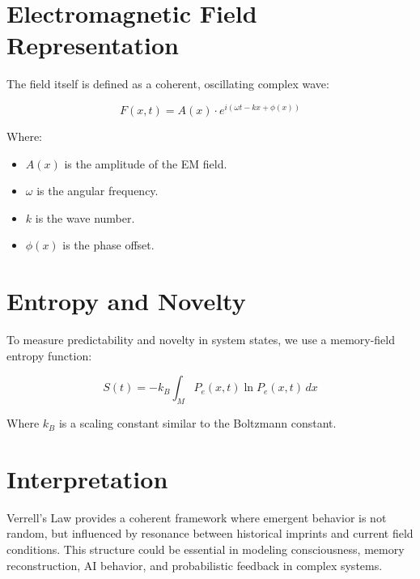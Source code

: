 \documentclass[12pt]{article}
\begin{document}
\section{Electromagnetic Field Representation}
The field itself is defined as a coherent, oscillating complex wave:

\begin{equation}
    F(x, t) = A(x) \cdot e^{i(\omega t - kx + \phi(x))}
\end{equation}

Where:
\begin{itemize}
    \item $A(x)$ is the amplitude of the EM field.
    \item $\omega$ is the angular frequency.
    \item $k$ is the wave number.
    \item $\phi(x)$ is the phase offset.
\end{itemize}

\section{Entropy and Novelty}
To measure predictability and novelty in system states, we use a memory-field entropy function:

\begin{equation}
    S(t) = -k_B \int_M P_e(x, t) \ln P_e(x, t) \, dx
\end{equation}

Where $k_B$ is a scaling constant similar to the Boltzmann constant.

\section{Interpretation}
Verrell's Law provides a coherent framework where emergent behavior is not random, but influenced by resonance between historical imprints and current field conditions. This structure could be essential in modeling consciousness, memory reconstruction, AI behavior, and probabilistic feedback in complex systems.
\end{document}
